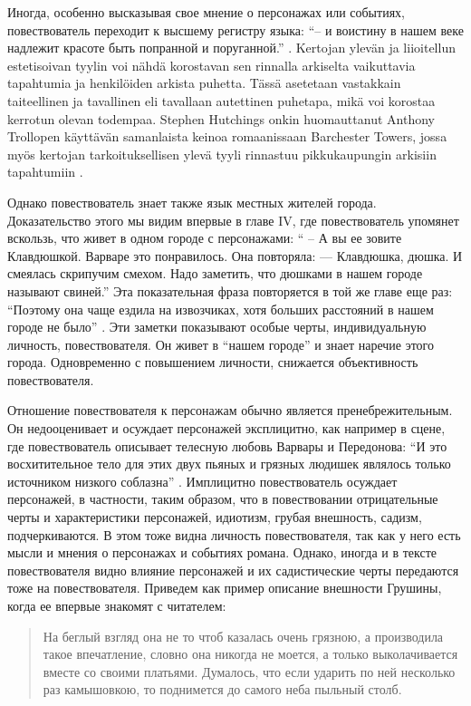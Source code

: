 \documentclass[12pt,a4paper]{article}
\begin{document}
Иногда, особенно высказывая свое мнение о персонажах или событиях, повествователь переходит к высшему регистру языка: \enquote{– и воистину в нашем веке надлежит красоте быть попранной и поруганной.} \parencite[51]{sologub2004}.
Kertojan ylevän ja liioitellun estetisoivan tyylin voi nähdä korostavan sen rinnalla arkiselta vaikuttavia tapahtumia ja henkilöiden arkista puhetta. Tässä asetetaan vastakkain taiteellinen ja tavallinen eli tavallaan autettinen puhetapa, mikä voi korostaa kerrotun olevan todempaa. Stephen Hutchings onkin huomauttanut Anthony Trollopen käyttävän samanlaista keinoa romaanissaan Barchester Towers, jossa myös kertojan tarkoituksellisen ylevä tyyli rinnastuu pikkukaupungin arkisiin tapahtumiin \parencite[23]{hutchings1997}.

Однако повествователь знает также язык местных жителей города. Доказательство этого мы видим впервые в главе IV, где повествователь упомянет вскользь, что живет в одном городе с персонажами: \enquote{ – А вы ее зовите Клавдюшкой.
Варваре это понравилось. Она повторяла:
— Клавдюшка, дюшка.
И смеялась скрипучим смехом. Надо заметить, что дюшками в
нашем городе называют свиней.} \Parencite[33.]{sologub2004} Эта показательная фраза повторяется в той же главе еще раз: \enquote{Поэтому она чаще ездила на извозчиках,
хотя больших расстояний в нашем городе не было} \parencite[34]{sologub2004}. Эти заметки показывают особые черты, индивидуальную личность,  повествователя. Он живет в \enquote{нашем городе} и знает наречие этого города. Одновременно с повышением личности, снижается объективность повествователя.

Отношение повествователя к персонажам обычно является пренебрежительным. Он недооценивает и осуждает персонажей эксплицитно, как например в сцене, где повествователь описывает телесную любовь Варвары и Передонова:
\enquote{И это восхитительное тело для этих двух пьяных и грязных людишек являлось только источником низкого соблазна} \parencite[51]{sologub2004}.
Имплицитно повествователь осуждает персонажей, в частности, таким образом, что в повествовании отрицательные черты и характеристики персонажей, идиотизм, грубая внешность, садизм, подчеркиваются. В этом тоже видна личность повествователя, так как у него есть мысли и мнения о персонажах и событиях романа. Однако, иногда и в тексте повествователя видно влияние персонажей и их садистические черты передаются тоже на повествователя. Приведем как пример описание внешности Грушины, когда ее впервые знакомят с читателем:


\begin{quote}
На беглый взгляд она не то
чтоб казалась очень грязною, а производила такое впечатление, словно
она никогда не моется, а только выколачивается вместе со своими
платьями. Думалось, что если ударить по ней несколько раз камышовкою,
то поднимется до самого неба пыльный столб.

\parencite[33.]{sologub2004}
\end{quote}
\end{document}
